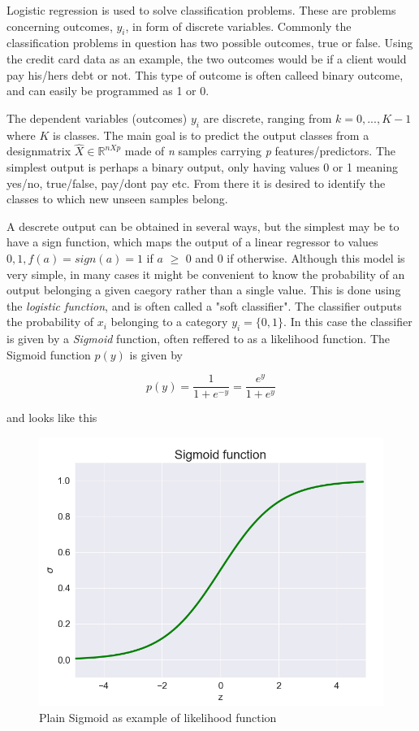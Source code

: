 \documentclass[a4paper,11pt,twocolumn]{article}
\begin{document}
Logistic regression is used to solve classification problems. These are problems concerning outcomes, $y_i$, in form of discrete variables. Commonly the classification problems in question has two possible outcomes, true or false. Using the credit card data as an example, the two outcomes would be if a client would pay his/hers debt or not. This type of outcome is often calleed binary outcome, and can easily be programmed as 1 or 0.

The dependent variables (outcomes) $y_i$ are discrete, ranging from $k=0,...,K-1$ where $K$ is classes. The main goal is to predict the output classes from a designmatrix $\hat{X} \in \mathbb{R}^{nXp}$ made of \textit{n} samples carrying \textit{p} features/predictors. The simplest output is perhaps a binary output, only having values 0 or 1 meaning yes/no, true/false, pay/dont pay etc. From there it is desired to identify the classes to which new unseen samples belong. 

A descrete output can be obtained in several ways, but the simplest may be to have a sign function, which maps the output of a linear regressor to values ${0,1}, f(a)=sign(a) = 1$ if $a$ $\geq$ 0 and 0 if otherwise.  Although this model is very simple, in many cases it might be convenient to know the probability of an output belonging a given caegory rather than a single value. This is done using the \textit{logistic function}, and is often called a "soft classifier".  The classifier outputs the probability of $x_i$ belonging to a category $y_i=\{0,1\}$. In this case the classifier is given by a \textit{Sigmoid} function, often reffered to as a likelihood function. The Sigmoid function $p(y)$ is given by\cite{slides}

\begin{equation}
p(y) = \frac{1}{1+e^{-y}}  = \frac{e^y}{1+e^y}
\label{p1}
\end{equation}

and looks like this 

\begin{figure}[h]
\centering
\includegraphics[scale=0.75]{Sigmoid}
\caption{Plain Sigmoid as example of likelihood function}
\label{Sigmoid}
\end{figure}
\end{document}
